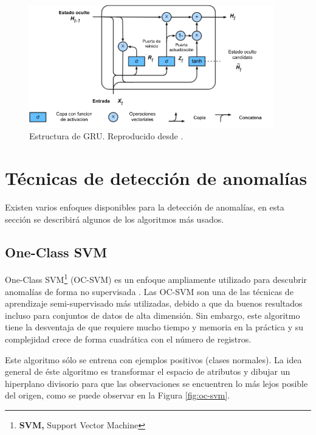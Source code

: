 \begin{figure}[h!]
  \begin{center}	\includegraphics[width=0.95\textwidth, frame]{imagenes/Cap4/gru}
  \caption{Estructura de GRU. Reproducido desde \protect\cite{Reference56}.} 
  \label{fig:gru}
  \end{center}
\end{figure}


\section{T\'{e}cnicas de detecci\'{o}n de anomal\'{i}as}

Existen varios enfoques disponibles para la detección de anomalías, en esta secci\'{o}n se describir\'{a} algunos de los algoritmos m\'{a}s usados.

\subsection{One-Class SVM}

One-Class SVM\footnote{\textbf{SVM, }Support Vector Machine} (OC-SVM) es un enfoque ampliamente utilizado para descubrir anomal\'{i}as de forma no supervisada \cite{Reference59}. Las OC-SVM son una de las técnicas de aprendizaje semi-supervisado más utilizadas, debido a que da buenos resultados incluso para conjuntos de datos de alta dimensión. Sin embargo, este algoritmo tiene la desventaja de que requiere mucho tiempo y memoria en la práctica y su complejidad crece de forma cuadrática con el número de registros.

\vspace{5mm} %

Este algoritmo s\'{o}lo se entrena con ejemplos positivos (clases normales). La idea general de \'{e}ste algoritmo es transformar el espacio de atributos y dibujar un hiperplano divisorio para que las observaciones se encuentren lo m\'{a}s lejos posible del origen, como se puede observar en la Figura \ref{fig:oc-svm}.

